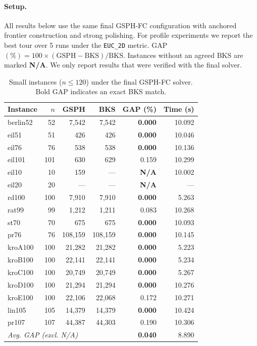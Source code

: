 \documentclass[runningheads]{llncs}
\begin{document}
\paragraph{Setup.}
All results below use the same final GSPH-FC configuration with
anchored frontier construction and strong polishing. For profile
experiments we report the best tour over 5 runs under the
\texttt{EUC\_2D} metric. GAP$(\%)=100\times
(\text{GSPH}-\text{BKS})/\text{BKS}$. Instances without an agreed BKS
are marked \textbf{N/A}. We only report results that were verified with
the final solver.

\begin{table}
\caption{Small instances ($n\le 120$) under the final GSPH-FC solver.
Bold GAP indicates an exact BKS match.}
\label{tab:small}
\centering\scriptsize
\begin{tabular}{@{}lrrrrr@{}}
\toprule
\textbf{Instance} & $n$ & \textbf{GSPH} & \textbf{BKS} & \textbf{GAP (\%)} & \textbf{Time (s)}\\
\midrule
berlin52 &  52 &   7{,}542 &   7{,}542 & \textbf{0.000} & 10.092 \\
 eil51    &  51 &       426 &       426 & \textbf{0.000} & 10.046 \\
 eil76    &  76 &       538 &       538 & \textbf{0.000} & 10.136 \\
 eil101   & 101 &       630 &       629 & 0.159 & 10.299 \\
 eil10    &  10 &       159 &        --- & \textbf{N/A} & 10.002 \\
 eil20    &  20 &        --- &        --- & \textbf{N/A} & --- \\
 rd100    & 100 &   7{,}910 &   7{,}910 & \textbf{0.000} & 5.263 \\
 rat99    &  99 &   1{,}212 &   1{,}211 & 0.083 & 10.268 \\
 st70     &  70 &       675 &       675 & \textbf{0.000} & 10.093 \\
 pr76     &  76 & 108{,}159 & 108{,}159 & \textbf{0.000} & 10.145 \\
 kroA100  & 100 &  21{,}282 &  21{,}282 & \textbf{0.000} & 5.223 \\
 kroB100  & 100 &  22{,}141 &  22{,}141 & \textbf{0.000} & 5.234 \\
 kroC100  & 100 &  20{,}749 &  20{,}749 & \textbf{0.000} & 5.267 \\
 kroD100  & 100 &  21{,}294 &  21{,}294 & \textbf{0.000} & 10.276 \\
 kroE100  & 100 &  22{,}106 &  22{,}068 & 0.172 & 10.271 \\
 lin105   & 105 &  14{,}379 &  14{,}379 & \textbf{0.000} & 10.424 \\
 pr107    & 107 &  44{,}387 &  44{,}303 & 0.190 & 10.306 \\
\midrule
\multicolumn{4}{l}{\textit{Avg. GAP (excl. N/A)}} & \textbf{0.040} & 8.890 \\
\bottomrule
\end{tabular}
\end{table}
\end{document}
